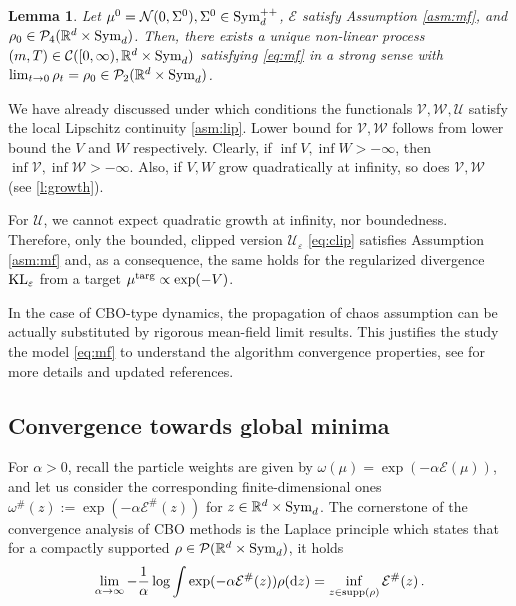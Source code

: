 \documentclass{article}
\theoremstyle{plain}
\newtheorem{lemma}[theorem]{Lemma}
\theoremstyle{definition}
\theoremstyle{remark}
\newcommand{\Rd}{ {\mathbb{R}^d}}
\newcommand{\E}{\mathcal{E}}
\newcommand{\ve}{\varepsilon}
\renewcommand{\d}{\mathrm{d}}
\newcommand{\supp}{\textup{supp}}
\newcommand{\sym}{\textup{Sym}_d}
\newcommand{\pd}{\textup{Sym}^{++}_d}
\newcommand{\KL}{\textup{KL}}
\newcommand{\targ}{\textup{targ}}
\begin{document}
\begin{lemma} \label{l:wellmf}
Let $\mu^0 = \mathcal{N}(0, \Sigma^0), \Sigma^0 \in \pd$, $\E$ satisfy Assumption \ref{asm:mf}, and $\rho_0 \in \mathcal{P}_4(\Rd\times \sym)$. Then, there exists a unique non-linear process $(m,T)\in \mathcal{C}([0,\infty), \Rd \times \sym)$ satisfying \eqref{eq:mf} in a strong sense with $\lim_{t\to 0}\rho_t = \rho_0\in \mathcal{P}_2(\Rd\times \sym)$.
\end{lemma}


We have already discussed under which conditions the functionals $\mathcal{V}, \mathcal{W}, \mathcal{U}$ satisfy the local Lipschitz continuity \eqref{asm:lip}. Lower bound for $\mathcal{V}, \mathcal{W}$ follows from lower bound the $V$ and $W$ respectively. Clearly, if $\inf V, \inf W>-\infty$, then $\inf \mathcal{V}, \inf \mathcal{W}>-\infty.$ Also, if $V, W$ grow quadratically at infinity, so does $\mathcal{V}, \mathcal{W}$ (see \cref{l:growth}).

For $\mathcal{U}$, we cannot expect quadratic growth at infinity, nor boundedness. Therefore, only the bounded, clipped version $\mathcal{U}_\ve$ \eqref{eq:clip} satisfies Assumption \ref{asm:mf} and, as a consequence, the same holds for the regularized divergence $\KL_\ve$ from a target $\mu^\targ \propto \exp(-V)$. 

In the case of CBO-type dynamics, the propagation of chaos assumption can be actually substituted by rigorous mean-field limit results.  
This justifies the study the model \eqref{eq:mf} to understand the algorithm convergence properties, see \cite{gerber2025uniform} for more details and updated references. 

\subsection{Convergence towards global minima}

 For $\alpha > 0$, recall the particle weights are given by $\omega(\mu) = \exp(-\alpha\E(\mu))$, and let us consider the corresponding finite-dimensional ones $\omega^\#(z) := \exp(-\alpha \E^\#(z))$ for $z\in \Rd\times \sym$.
The cornerstone of the convergence analysis of CBO methods is the Laplace principle \cite{dembo2010} which states that for a compactly supported $\rho\in \mathcal{P}(\Rd\times \sym)$, it holds
\begin{equation} \label{eq:laplace}
\lim_{\alpha \to \infty} -\frac1\alpha  \log \int  \exp(- \alpha \E^{\#}(z))\rho(\d z)= \inf_{z\in \supp({\rho})} \E^{\#}(z) \,.
\end{equation}
\end{document}
